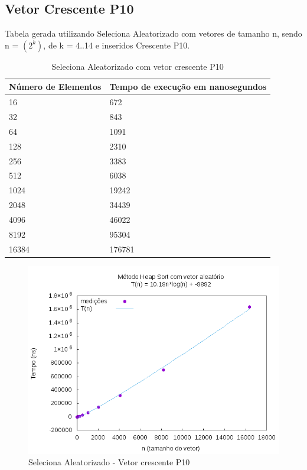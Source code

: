 \documentclass[12pt,a4paper,twoside]{report}
\begin{document}
\subsection{Vetor Crescente P10}
Tabela gerada utilizando Seleciona Aleatorizado com vetores de tamanho n, sendo n = $(2^k)$, de k = 4..14 e inseridos Crescente P10.
\begin{table}[H]
\centering
\caption{Seleciona Aleatorizado com vetor crescente P10}
\label{my-label}
\begin{tabular}{|l|l|}
\hline
\multicolumn{1}{|c|}{\textbf{Número de Elementos}} & \multicolumn{1}{c|}{\textbf{Tempo de execução em nanosegundos}} \\ \hline
16 & 672 \\ \hline
32 & 843 \\ \hline
64 & 1091 \\ \hline
128 & 2310 \\ \hline
256 & 3383 \\ \hline
512 & 6038 \\ \hline
1024 & 19242 \\ \hline
2048 & 34439 \\ \hline
4096 & 46022 \\ \hline
8192 & 95304 \\ \hline
16384 & 176781 \\ \hline

\end{tabular}
\end{table}

\begin{figure}[H]
    \centering
    \includegraphics[width=0.7\linewidth]{graficos/HeapSort/vIntAleatorio/vIntAleatorio.png}
  \caption{Seleciona Aleatorizado - Vetor crescente P10}
\end{figure}
\end{document}
